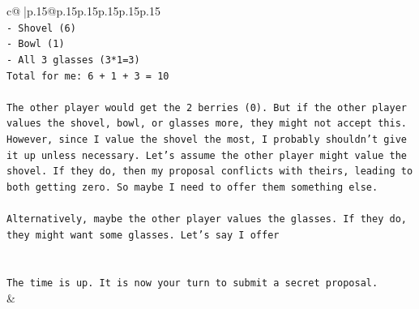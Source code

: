 \documentclass{article}
\begin{document}
{\begin{supertabular}{c@{$\;$}|p{.15\linewidth}@{}p{.15\linewidth}p{.15\linewidth}p{.15\linewidth}p{.15\linewidth}p{.15\linewidth}}
{{{\\ 
\texttt{{-} Shovel (6)} \\
\texttt{{-} Bowl (1)} \\
\texttt{{-} All 3 glasses (3*1=3)} \\
\texttt{Total for me: 6 + 1 + 3 = 10} \\
\\ 
\texttt{The other player would get the 2 berries (0). But if the other player values the shovel, bowl, or glasses more, they might not accept this. However, since I value the shovel the most, I probably shouldn't give it up unless necessary. Let's assume the other player might value the shovel. If they do, then my proposal conflicts with theirs, leading to both getting zero. So maybe I need to offer them something else.} \\
\\ 
\texttt{Alternatively, maybe the other player values the glasses. If they do, they might want some glasses. Let's say I offer} \\
\\ 
\\ 
\texttt{The time is up. It is now your turn to submit a secret proposal.} \\
            }
        }
    }
    & \\ \\


\end{supertabular}}
\end{document}
